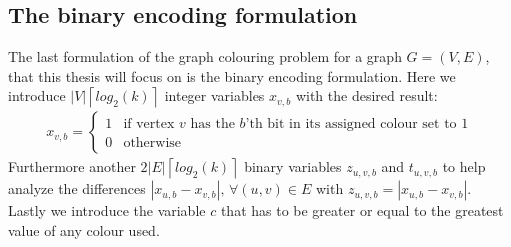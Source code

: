 \subsection{The binary encoding formulation}
The last formulation of the graph colouring problem for a graph $G=(V,E)$, that this thesis will focus on is the binary encoding formulation. Here we introduce $|V|\left \lceil{log_2(k)}\right \rceil $ integer variables $x_{v,b}$ with the desired result:
\begin{align}\label{binX}
x_{v,b} =\left\{
\begin{array}{ll}
1 & \text{if vertex }v \text{ has the $b$'th bit in its assigned colour set to 1} \\ 0 & \text{otherwise}
\end{array}\right.
\end{align} 
Furthermore another $2|E|\left \lceil{log_2(k)}\right \rceil$ binary variables $z_{u,v,b}$ and $t_{u,v,b}$ to help analyze the differences $|x_{u,b}-x_{v,b}|, \, \forall (u,v) \in E$ with $z_{u,v,b} = |x_{u,b}-x_{v,b}|$.
Lastly we introduce the variable $c$ that has to be greater or equal to the greatest value of any colour used.
